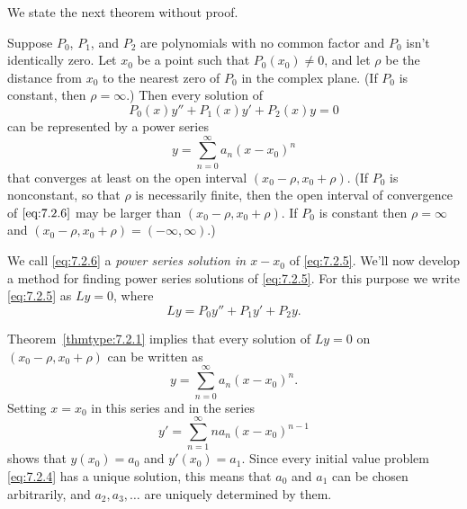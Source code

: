 \documentclass{ximera}
\begin{document}
We state the next theorem without proof.

\begin{theorem}\label{thmtype:7.2.1}
Suppose $P_0$, $P_1$, and $P_2$ are polynomials with no common
factor and $P_0$ isn't identically zero. Let $x_0$ be a point such
that $P_0(x_0)\neq0$, and let $\rho$ be the distance from $x_0$ to the
nearest zero of $P_0$ in the complex plane. (If $P_0$ is constant,
then $\rho=\infty$.) Then every solution of
\begin{equation}\label{eq:7.2.5}
P_0(x)y''+P_1(x)y'+P_2(x)y=0
\end{equation}
can be represented by a power series
 \begin{equation}\label{eq:7.2.6}
y=\sum_{n=0}^\infty a_n(x-x_0)^n
\end{equation}
that converges at least on the open interval $(x_0-\rho,x_0+\rho)$.
(If $P_0$ is nonconstant, so that $\rho$ is necessarily finite,
then the open interval of convergence of $\eqref{eq:7.2.6}$ may be larger
than $(x_0-\rho,x_0+\rho)$. If $P_0$ is constant then $\rho=\infty$
and $(x_0-\rho,x_0+\rho)=(-\infty,\infty)$.)
\end{theorem}

We call \eqref{eq:7.2.6} a \textit{power series solution in $x-x_0$}  of
\eqref{eq:7.2.5}. We'll now develop a method for finding power series
solutions of \eqref{eq:7.2.5}. For this purpose we write \eqref{eq:7.2.5} as
$Ly=0$, where
\begin{equation}\label{eq:7.2.7}
Ly=P_0y''+P_1y'+P_2y.
\end{equation}

Theorem~\ref{thmtype:7.2.1} implies that every solution of $Ly=0$ on
$(x_0-\rho,x_0+\rho)$ can be written as
$$
y=\sum_{n=0}^\infty a_n(x-x_0)^n.
$$
Setting $x=x_0$ in this series and in the series
$$
y'=\sum_{n=1}^\infty na_n(x-x_0)^{n-1}
$$
shows that $y(x_0)=a_0$ and $y'(x_0)=a_1$. Since every initial value
problem \eqref{eq:7.2.4} has a unique solution, this means that $a_0$ and
$a_1$ can be chosen arbitrarily, and  $a_2, a_3, \dots$ are
uniquely determined by them.
\end{document}
